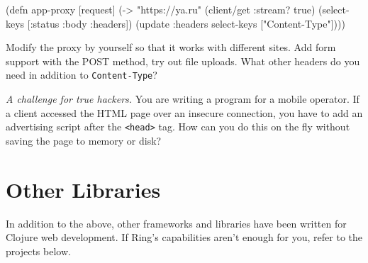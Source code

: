 \begin{english}
\begin{clojure}
(defn app-proxy [request]
(-> "https://ya.ru"
(client/get {:stream? true})
(select-keys [:status :body :headers])
(update :headers select-keys ["Content-Type"])))
\end{clojure}
\end{english}

Modify the proxy by yourself so that it works with different sites. Add form support with the POST method, try out file uploads. What other headers do you need in addition to \verb|Content-Type|?

\emph{A challenge for true hackers.} You are writing a program for a mobile operator. If a client accessed the HTML page over an insecure connection, you have to add an advertising script after the \verb|<head>| tag. How can you do this on the fly without saving the page to memory or disk?

\section{Other Libraries}

In addition to the above, other frameworks and libraries have been written for Clojure web development. If Ring's capabilities aren't enough for you, refer to the projects below.

